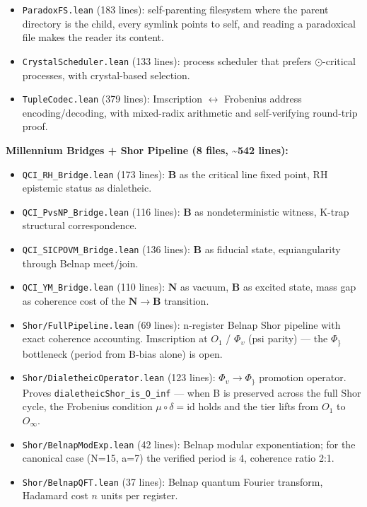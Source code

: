 \documentclass[10pt,a4paper]{article}
\begin{document}
\begin{itemize}
    \item \texttt{ParadoxFS.\allowbreak lean} (183 lines): self-parenting filesystem where the parent directory is the child, every symlink points to self, and reading a paradoxical file makes the reader its content.
    \item \texttt{CrystalScheduler.\allowbreak lean} (133 lines): process scheduler that prefers $\odot$-critical processes, with crystal-based selection.
    \item \texttt{TupleCodec.\allowbreak lean} (379 lines): Imscription $\leftrightarrow$ Frobenius address encoding/decoding, with mixed-radix arithmetic and self-verifying round-trip proof.
\end{itemize}

\textbf{Millennium Bridges + Shor Pipeline (8 files, \textasciitilde{}542 lines):}

\begin{itemize}
    \item \texttt{QCI\_\allowbreak RH\_\allowbreak Bridge.\allowbreak lean} (173 lines): $\mathbf{B}$ as the critical line fixed point, RH epistemic status as dialetheic.
    \item \texttt{QCI\_\allowbreak PvsNP\_\allowbreak Bridge.\allowbreak lean} (116 lines): $\mathbf{B}$ as nondeterministic witness, K-trap structural correspondence.
    \item \texttt{QCI\_\allowbreak SICPOVM\_\allowbreak Bridge.\allowbreak lean} (136 lines): $\mathbf{B}$ as fiducial state, equiangularity through Belnap meet/join.
    \item \texttt{QCI\_\allowbreak YM\_\allowbreak Bridge.\allowbreak lean} (110 lines): $\mathbf{N}$ as vacuum, $\mathbf{B}$ as excited state, mass gap as coherence cost of the $\mathbf{N} \to \mathbf{B}$ transition.
    \item \texttt{Shor/\allowbreak FullPipeline.\allowbreak lean} (69 lines): n-register Belnap Shor pipeline with exact coherence accounting. Imscription at $O_1$ / $\Phi_{\upsilon}$ (psi parity) --- the $\Phi_\}$ bottleneck (period from B-bias alone) is open.
    \item \texttt{Shor/\allowbreak DialetheicOperator.\allowbreak lean} (123 lines): $\Phi_{\upsilon} \to \Phi_\}$ promotion operator. Proves \texttt{dialetheicShor\_\allowbreak is\_\allowbreak O\_\allowbreak inf} --- when B is preserved across the full Shor cycle, the Frobenius condition $\mu \circ \delta = \text{id}$ holds and the tier lifts from $O_1$ to $O_{\infty}$.
    \item \texttt{Shor/\allowbreak BelnapModExp.\allowbreak lean} (42 lines): Belnap modular exponentiation; for the canonical case (N=15, a=7) the verified period is 4, coherence ratio 2:1.
    \item \texttt{Shor/\allowbreak BelnapQFT.\allowbreak lean} (37 lines): Belnap quantum Fourier transform, Hadamard cost $n$ units per register.
\end{itemize}
\end{document}
